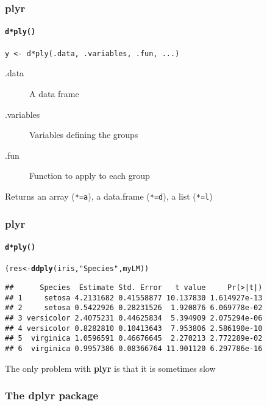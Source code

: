 \documentclass[paper=screen,mathserif]{beamer}\usepackage[]{graphicx}\usepackage[]{color}
\makeatletter
\newcommand{\hlstr}[1]{\textcolor[rgb]{0.192,0.494,0.8}{#1}}%
\newcommand{\hlstd}[1]{\textcolor[rgb]{0.345,0.345,0.345}{#1}}%
\newcommand{\hlkwb}[1]{\textcolor[rgb]{0.69,0.353,0.396}{#1}}%
\newcommand{\hlkwd}[1]{\textcolor[rgb]{0.737,0.353,0.396}{\textbf{#1}}}%
\newenvironment{kframe}{%
 \def\at@end@of@kframe{}%
 \ifinner\ifhmode%
  \def\at@end@of@kframe{\end{minipage}}%
  \begin{minipage}{\columnwidth}%
 \fi\fi%
 \def\FrameCommand##1{\hskip\@totalleftmargin \hskip-\fboxsep
 \colorbox{shadecolor}{##1}\hskip-\fboxsep
     \hskip-\linewidth \hskip-\@totalleftmargin \hskip\columnwidth}%
 \MakeFramed {\advance\hsize-\width
   \@totalleftmargin\z@ \linewidth\hsize
   \@setminipage}}%
 {\par\unskip\endMakeFramed%
 \at@end@of@kframe}
\newenvironment{knitrout}{}{} %
\newcommand{\ft}[1]{\frametitle{#1}}
\newcommand{\fst}[1]{\framesubtitle{#1}}
\makeatother
\begin{document}
\begin{frame}[fragile]
  \ft{{\bf plyr}}
  \fst{{\tt d*ply()}}
  
  \verb=y <- d*ply(.data, .variables, .fun, ...)=
  \vspace{0.5cm}
  \begin{description}
  \item[.data] A data frame
  \item[.variables] Variables defining the groups
  \item[.fun] Function to apply to each group
  \end{description}
  Returns an array (\verb|*=a|), a data.frame (\verb|*=d|), a list
  (\verb|*=l|)
  
\end{frame}

\begin{frame}[fragile]
  \ft{{\bf plyr}}
  \fst{{\tt d*ply()}}

\begin{knitrout}\scriptsize
{}\color{fgcolor}\begin{kframe}
\begin{alltt}
\hlstd{(res} \hlkwb{<-} \hlkwd{ddply}\hlstd{(iris,} \hlstr{"Species"}\hlstd{, myLM))}
\end{alltt}
\begin{verbatim}
##      Species  Estimate Std. Error   t value     Pr(>|t|)
## 1     setosa 4.2131682 0.41558877 10.137830 1.614927e-13
## 2     setosa 0.5422926 0.28231526  1.920876 6.069778e-02
## 3 versicolor 2.4075231 0.44625834  5.394909 2.075294e-06
## 4 versicolor 0.8282810 0.10413643  7.953806 2.586190e-10
## 5  virginica 1.0596591 0.46676645  2.270213 2.772289e-02
## 6  virginica 0.9957386 0.08366764 11.901120 6.297786e-16
\end{verbatim}
\end{kframe}
\end{knitrout}

\pause \vspace{0.5cm} 
The only problem with {\bf plyr} is that it
is sometimes slow
\end{frame}

\begin{frame}
  \ft{The {\bf dplyr} package}
  
\end{frame}
\end{document}
